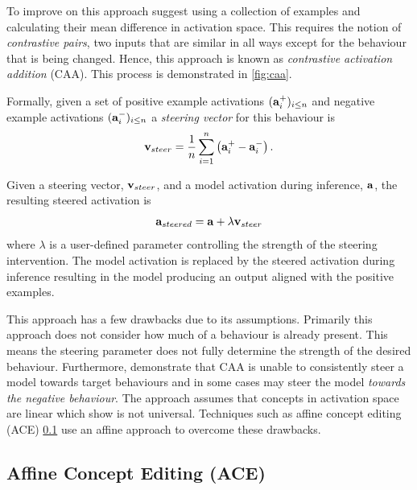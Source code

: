 To improve on this approach \citet{caa} suggest using a collection of examples and calculating their mean difference in activation space.
This requires the notion of \emph{contrastive pairs}, two inputs that are similar in all ways except for the behaviour that is being changed.
Hence, this approach is known as \emph{contrastive activation addition} (CAA).
This process is demonstrated in \cref{fig:caa}.

Formally, given a set of positive example activations $(\mathbf{a}_i^+)_{i\le n}$ and negative example activations $(\mathbf{a}_i^-)_{i\le n}$ a \emph{steering vector} for this behaviour is
\[\mathbf{v}_{steer} = \frac{1}{n}\sum_{i=1}^{n}\left(\mathbf{a}_i^+ - \mathbf{a}_i^-\right).\]

Given a steering vector, $\mathbf{v}_{steer}$, and a model activation during inference, $\mathbf{a}$, the resulting steered activation is
\begin{equation}
    \label{eq:caa}
    \mathbf{a}_{steered} = \mathbf{a} + \lambda\mathbf{v}_{steer}
\end{equation}
where $\lambda$ is a user-defined parameter controlling the strength of the steering intervention.
The model activation is replaced by the steered activation during inference resulting in the model producing an output aligned with the positive examples.

This approach has a few drawbacks \citep{steerability, ace, non-linear-features} due to its assumptions.
Primarily this approach does not consider how much of a behaviour is already present.
This means the steering parameter does not fully determine the strength of the desired behaviour.
Furthermore, \citet{steerability} demonstrate that CAA is unable to consistently steer a model towards target behaviours and in some cases may steer the model \emph{towards the negative behaviour}.
The approach assumes that concepts in activation space are linear which \citet{non-linear-features} show is not universal.
Techniques such as affine concept editing (ACE) \cref{sec:ace} use an affine approach to overcome these drawbacks.

\subsection{Affine Concept Editing (ACE)}
\label{sec:ace}

